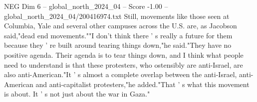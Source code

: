 \begin{textsample}{NEG Dim 6 – global\_north\_2024\_04 – Score -1.00 – global\_north\_2024\_04/200416974.txt}
Still, movements like those seen at Columbia, Yale and several other campuses across the U.S. are, as Jacobson said,"dead end movements.""I don't think there ' s really a future for them because they ' re built around tearing things down,"he said."They have no positive agenda.
Their agenda is to tear things down, and I think what people need to understand is that these protesters, who ostensibly are anti-Israel, are also anti-American."It ' s almost a complete overlap between the anti-Israel, anti-American and anti-capitalist protesters,"he added."That ' s what this movement is about.
It ' s not just about the war in Gaza."

\end{textsample}
